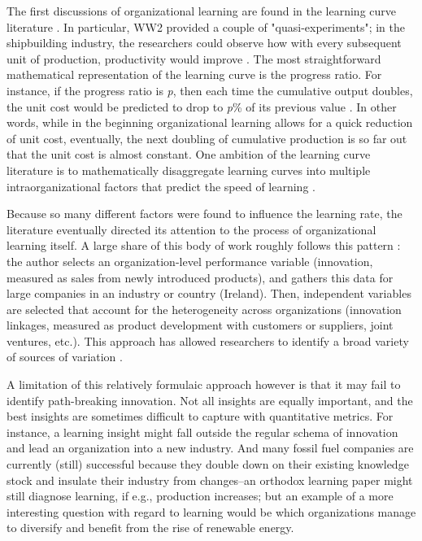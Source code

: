 The first discussions of organizational learning are found in the learning curve literature \citep{Wright1936}. In particular, WW2 provided a couple of "quasi-experiments"; in the shipbuilding industry, the researchers could observe how with every subsequent unit of production, productivity would improve \citep{Searle1945}. The most straightforward mathematical representation of the learning curve is the progress ratio. For instance, if the progress ratio is \textit{p}, then each time the cumulative output doubles, the unit cost would be predicted to drop to \textit{p}\% of its previous value \citep[p. 15]{Argote2013-1}. In other words, while in the beginning organizational learning allows for a quick reduction of unit cost, eventually, the next doubling of cumulative production is so far out that the unit cost is almost constant. One ambition of the learning curve literature is to mathematically disaggregate learning curves into multiple intraorganizational factors that predict the speed of learning \citep[e.g.,][]{Arrow1962}.

Because so many different factors were found to influence the learning rate, the literature eventually directed its attention to the process of organizational learning itself. A large share of this body of work roughly follows this pattern \citep[taken from][]{Love2014}: the author selects an organization-level performance variable (innovation, measured as sales from newly introduced products), and gathers this data for large companies in an industry or country (Ireland). Then, independent variables are selected that account for the heterogeneity across organizations (innovation linkages, measured as product development with customers or suppliers, joint ventures, etc.). This approach has allowed researchers to identify a broad variety of sources of variation \citep[pp. 18ff]{Argote2013-1}.

A limitation of this relatively formulaic approach however is that it may fail to identify path-breaking innovation. Not all insights are equally important, and the best insights are sometimes difficult to capture with quantitative metrics. For instance, a learning insight might fall outside the regular schema of innovation and lead an organization into a new industry. And many fossil fuel companies are currently (still) successful because they double down on their existing knowledge stock and insulate their industry from changes--an orthodox learning paper might still diagnose learning, if e.g., production increases; but an example of a more interesting question with regard to learning would be which organizations manage to diversify and benefit from the rise of renewable energy.


